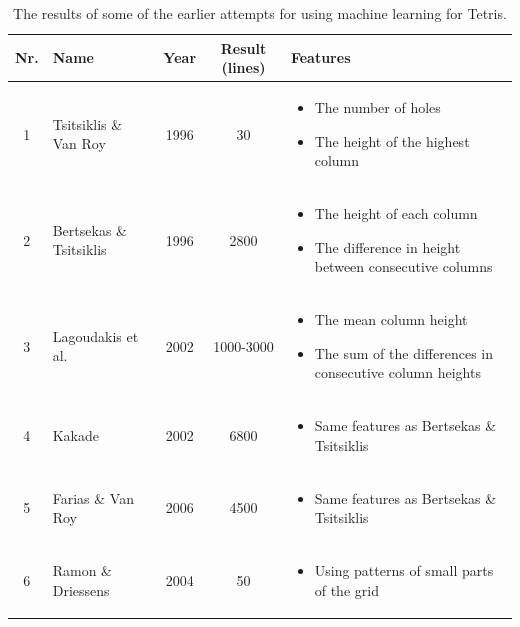 \documentclass{report}
\begin{document}
\begin{table}[h!]
    \centering
    \caption{The results of some of the earlier attempts for using machine learning for Tetris.}
    \label{tab:EA}
    \begin{tabular}{c|p{4cm}|c|c|p{6cm}}
        Nr. & Name & Year & Result (lines) & Features \\ \hline
        1 & Tsitsiklis \& Van Roy & 1996 & 30 & \begin{itemize}
            \item The number of holes
            \item The height of the highest column
        \end{itemize}\\ \hline
        2 & Bertsekas \& Tsitsiklis & 1996 & 2800 & \begin{itemize}
            \item The height of each column
            \item The difference in height between consecutive columns
        \end{itemize} \\ \hline
        3 & Lagoudakis et al. & 2002 & 1000-3000 & \begin{itemize}
            \item The mean column height
            \item The sum of the differences in consecutive column heights
        \end{itemize} \\ \hline
        4 & Kakade & 2002 & 6800 & \begin{itemize}
            \item Same features as Bertsekas \& Tsitsiklis
        \end{itemize} \\ \hline
        5 & Farias \& Van Roy & 2006 & 4500 & \begin{itemize}
            \item Same features as Bertsekas \& Tsitsiklis
        \end{itemize} \\ \hline
        6 & Ramon \& Driessens & 2004 & 50 & \begin{itemize}
            \item Using patterns of small parts of the grid
        \end{itemize} \\ \hline
    \end{tabular}
\end{table}
\end{document}

